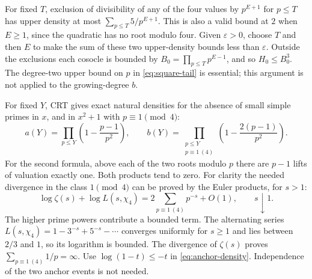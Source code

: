 \documentclass[11pt,a4paper]{article}
\theoremstyle{definition}\newtheorem{question}[theorem]{Question}
\theoremstyle{remark}\newtheorem{remark}[theorem]{Remark}
\begin{document}
For fixed $T$, exclusion of divisibility of any of the four values by
$p^{E+1}$ for $p\le T$ has upper density at most
$\sum_{p\le T}5/p^{E+1}$. This is also a valid bound at $2$ when
$E\ge1$, since the quadratic has no root modulo four.
Given $\varepsilon>0$, choose $T$ and then $E$ to make the sum
of these two upper-density bounds less than $\varepsilon$.
Outside the exclusions each cosocle is bounded by
$B_0=\prod_{p\le T}p^{E-1}$, and so $H_0\le B_0^3$.
The degree-two upper bound on $p$ in \eqref{eq:square-tail} is
essential; this argument is not applied to the growing-degree $b$.

For fixed $Y$, CRT gives exact natural densities for the absence
of small simple primes in $x$, and in $x^2+1$ with $p\equiv1\pmod4$:
\begin{equation}\label{eq:anchor-density}
 a(Y)=\prod_{p\le Y}\left(1-\frac{p-1}{p^2}\right),\qquad
 b(Y)=\prod_{\substack{p\le Y\\p\equiv1\ (4)}}
                 \left(1-\frac{2(p-1)}{p^2}\right).
\end{equation}
For the second formula, above each of the two roots modulo $p$
there are $p-1$ lifts of valuation exactly one. Both products tend
to zero. For clarity the needed divergence in the class $1\pmod4$
can be proved by the Euler products, for $s>1$:
\[
 \log\zeta(s)+\log L(s,\chi_4)
       =2\sum_{p\equiv1\ (4)}p^{-s}+O(1),\qquad s\downarrow1.
\]
The higher prime powers contribute a bounded term. The alternating
series $L(s,\chi_4)=1-3^{-s}+5^{-s}-\cdots$ converges uniformly for
$s\ge1$ and lies between $2/3$ and $1$, so its logarithm is bounded.
The divergence of $\zeta(s)$ proves $\sum_{p\equiv1\ (4)}1/p=\infty$.
Use $\log(1-t)\le-t$ in \eqref{eq:anchor-density}.
Independence of the two anchor events is not needed.
\end{document}
